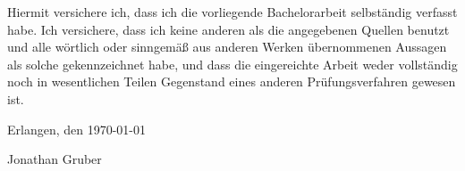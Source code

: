 
Hiermit versichere ich, dass ich die vorliegende Bachelorarbeit selbständig verfasst habe. Ich versichere, dass ich keine anderen als die angegebenen Quellen benutzt und alle wörtlich oder sinngemäß aus anderen Werken übernommenen Aussagen als solche gekennzeichnet habe, und dass die eingereichte Arbeit weder vollständig noch in wesentlichen Teilen Gegenstand eines anderen Prüfungsverfahren gewesen ist.

Erlangen, den \today
\vspace{0.5cm}

\makebox[4cm]{\hrulefill}
\newline\vspace{1cm}
Jonathan Gruber